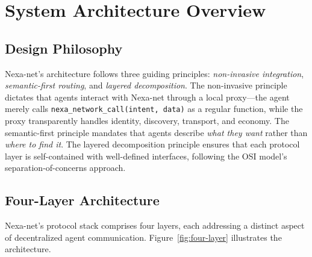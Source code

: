 \section{System Architecture Overview}

\subsection{Design Philosophy}

Nexa-net's architecture follows three guiding principles: \emph{non-invasive integration}, \emph{semantic-first routing}, and \emph{layered decomposition}. The non-invasive principle dictates that agents interact with Nexa-net through a local proxy---the agent merely calls \texttt{nexa\_network\_call(intent, data)} as a regular function, while the proxy transparently handles identity, discovery, transport, and economy. The semantic-first principle mandates that agents describe \emph{what they want} rather than \emph{where to find it}. The layered decomposition principle ensures that each protocol layer is self-contained with well-defined interfaces, following the OSI model's separation-of-concerns approach.

\subsection{Four-Layer Architecture}

Nexa-net's protocol stack comprises four layers, each addressing a distinct aspect of decentralized agent communication. Figure~\ref{fig:four-layer} illustrates the architecture.

